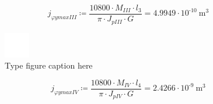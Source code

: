 \documentclass{article}
\newcommand{\defeq}{\coloneq} %
\begin{document}
\begin{equation*}
j_{φymaxIII} \defeq \frac{10800 \cdot M_{III} \cdot \textit{l}_{\textit{3}}}{{\pi} \cdot J_{pIII} \cdot G} = {4.9949 \cdot 10^{ \operatorname{-} 10} \: \mathrm{m}^{3}}
\end{equation*}
\begin{figure}[h!]
 \begin{center}
  \includegraphics[max width=\textwidth]{calculations/911.png}
  \caption{Type figure caption here}
  \label{fig:911}
 \end{center}
\end{figure}
\begin{equation*}
j_{φymaxIV} \defeq \frac{10800 \cdot M_{IV} \cdot \textit{l}_{\textit{4}}}{{\pi} \cdot J_{pIV} \cdot G} = {2.4266 \cdot 10^{ \operatorname{-} 9} \: \mathrm{m}^{3}}
\end{equation*}
\end{document}
